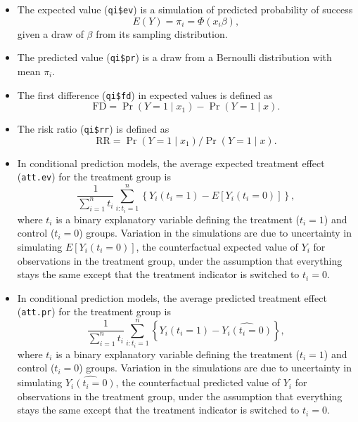 \begin{itemize}

\item The expected value ({\tt qi\$ev}) is a simulation of predicted
  probability of success $$E(Y) = \pi_i = \Phi(x_i
  \beta),$$ given a draw of $\beta$ from its sampling distribution.  

\item The predicted value ({\tt qi\$pr}) is a draw from a Bernoulli
  distribution with mean $\pi_i$.  
  
\item The first difference ({\tt qi\$fd}) in expected values is
  defined as
\begin{equation*}
\textrm{FD} = \Pr(Y = 1 \mid x_1) - \Pr(Y = 1 \mid x).
\end{equation*}

\item The risk ratio ({\tt qi\$rr}) is defined as
\begin{equation*}
\textrm{RR} = \Pr(Y = 1 \mid x_1) / \Pr(Y = 1 \mid x).
\end{equation*}

\item In conditional prediction models, the average expected treatment
  effect ({\tt att.ev}) for the treatment group is 
    \begin{equation*} \frac{1}{\sum_{i=1}^n t_i}\sum_{i:t_i=1}^n \left\{ Y_i(t_i=1) -
      E[Y_i(t_i=0)] \right\},
    \end{equation*} 
    where $t_i$ is a binary explanatory variable defining the treatment
    ($t_i=1$) and control ($t_i=0$) groups.  Variation in the
    simulations are due to uncertainty in simulating $E[Y_i(t_i=0)]$,
    the counterfactual expected value of $Y_i$ for observations in the
    treatment group, under the assumption that everything stays the
    same except that the treatment indicator is switched to $t_i=0$.

\item In conditional prediction models, the average predicted treatment
  effect ({\tt att.pr}) for the treatment group is 
    \begin{equation*} \frac{1}{\sum_{i=1}^n t_i}\sum_{i:t_i=1}^n \left\{ Y_i(t_i=1) -
      \widehat{Y_i(t_i=0)} \right\},
    \end{equation*} 
    where $t_i$ is a binary explanatory variable defining the
    treatment ($t_i=1$) and control ($t_i=0$) groups.  Variation in
    the simulations are due to uncertainty in simulating
    $\widehat{Y_i(t_i=0)}$, the counterfactual predicted value of
    $Y_i$ for observations in the treatment group, under the
    assumption that everything stays the same except that the
    treatment indicator is switched to $t_i=0$.
\end{itemize}

